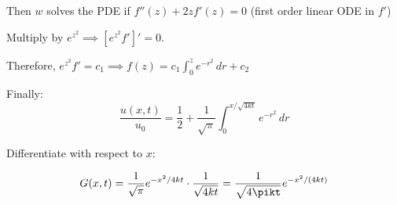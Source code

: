 \documentclass[main.tex]{subfiles}
\begin{document}
Then $w$ solves the PDE if $f''(z) + 2zf'(z) = 0$ (first order linear ODE in $f'$)

Multiply by $e^{z^2}\implies \left[e^{z^2}f'\right]' = 0$.

Therefore, $e^{z^2}f' = c_1 \implies f(z) = c_1\int_0^z e^{-r^2}\,dr + c_2$

Finally:
\begin{equation}
\frac{u(x,t)}{u_0} = \frac{1}{2} + \frac{1}{\sqrt{\pi}}\int_0^{x/\sqrt{4kt}} e^{-r^2}\,dr
\end{equation}

Differentiate with respect to $x$:

$$G(x, t) = \frac{1}{\sqrt{\pi}}e^{-x^2/4kt}\cdot\frac{1}{\sqrt{4kt}} = \frac{1}{\sqrt{4\pikt}} e^{-x^2/(4kt)}$$
\end{document}
